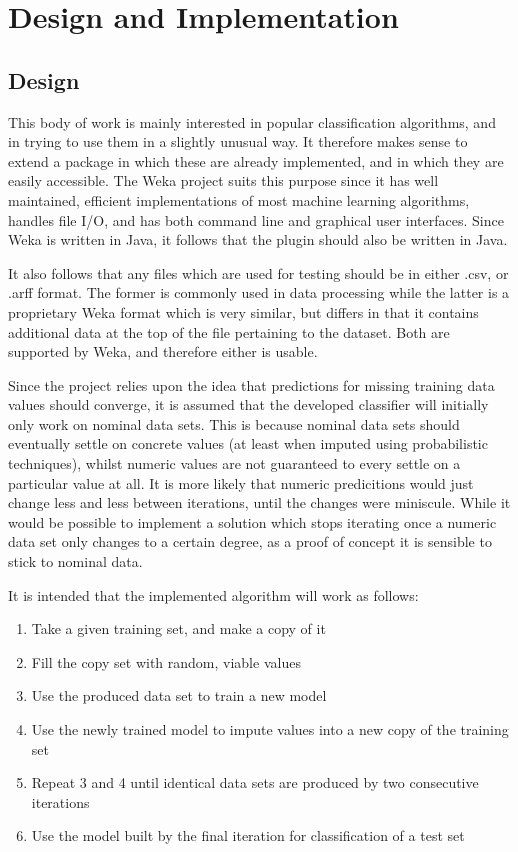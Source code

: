 \newpage
\chapter{Design and Implementation} 
\section{Design}
\label{design}
This body of work is mainly interested in popular classification algorithms, and in trying to use them in a slightly unusual way. It therefore makes sense to extend a package in which these are already implemented, and in which they are easily accessible. The Weka project \cite{weka} suits this purpose since it has well maintained, efficient implementations of most machine learning algorithms, handles file I/O, and has both command line and graphical user interfaces. Since Weka is written in Java, it follows that the plugin should also be written in Java.

It also follows that any files which are used for testing should be in either .csv, or .arff format. The former is commonly used in data processing while the latter is a proprietary Weka format which is very similar, but differs in that it contains additional data at the top of the file pertaining to the dataset. Both are supported by Weka, and therefore either is usable.

Since the project relies upon the idea that predictions for missing training data values should converge, it is assumed that the developed classifier will initially only work on nominal data sets. This is because nominal data sets should eventually settle on concrete values (at least when imputed using probabilistic techniques), whilst numeric values are not guaranteed to every settle on a particular value at all. It is more likely that numeric predicitions would just change less and less between iterations, until the changes were miniscule. While it would be possible to implement a solution which stops iterating once a numeric data set only changes to a certain degree, as a proof of concept it is sensible to stick to nominal data.

It is intended that the implemented algorithm will work as follows:
\begin{enumerate}
\item Take a given training set, and make a copy of it
\item Fill the copy set with random, viable values
\item Use the produced data set to train a new model
\item Use the newly trained model to impute values into a new copy of the training set
\item Repeat 3 and 4 until identical data sets are produced by two consecutive iterations
\item Use the model built by the final iteration for classification of a test set
\end{enumerate}

